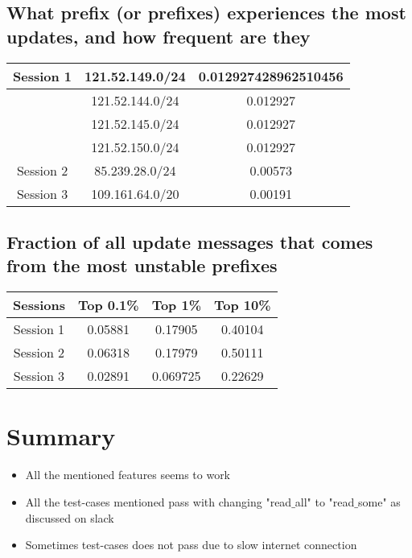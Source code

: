 \documentclass[11pt,a4paper,titlepage]{article}
\begin{document}
\subsection{What prefix (or prefixes) experiences the most updates, and how frequent are they}
\begin{table}[H]
	\centering
	\begin{tabular}{ |c|c|c|}
		\hline
 Session 1 & 121.52.149.0/24 & 0.012927428962510456 \\ \hline
 &121.52.144.0/24 & 0.012927  \\ \hline
 & 121.52.145.0/24 & 0.012927  \\ \hline
 &121.52.150.0/24 &  0.012927  \\ \hline
 Session 2 &85.239.28.0/24 &  0.00573  \\ \hline
 Session 3 &109.161.64.0/20 &  0.00191  \\ \hline
	\end{tabular}
\end{table}

\subsection{Fraction of all update messages that comes from the most unstable prefixes}
\begin{table}[H]
	\centering
	\begin{tabular}{ |c|c|c|c|}
		\hline
Sessions & Top 0.1\% & Top 1\% & Top 10\%\\ \hline
Session 1 & 0.05881 & 0.17905& 0.40104 \\ \hline
Session 2 & 0.06318& 0.17979&  0.50111 \\ \hline
Session 3 & 0.02891 & 0.069725 & 0.22629 \\ \hline
	\end{tabular}
\end{table}



\section{Summary}
\begin{itemize}
\item All the mentioned features seems to work
\item All the test-cases mentioned pass with changing "read$\_$all" to "read$\_$some" as discussed on slack
\item Sometimes test-cases does not pass due to slow internet connection 
\end{itemize}
\end{document}
